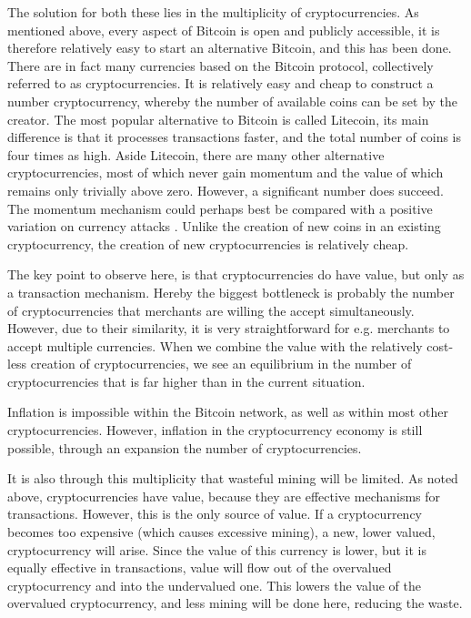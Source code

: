 \documentclass[12pt]{article}\usepackage[]{graphicx}\usepackage[]{color}
\begin{document}
The solution for both these lies in the multiplicity of cryptocurrencies.
As mentioned above, every aspect of Bitcoin is open and publicly accessible,
it is therefore relatively easy to start an alternative Bitcoin, and this has been done.
There are in fact many currencies based on the Bitcoin protocol, collectively referred to as
cryptocurrencies.
It is relatively easy and cheap to construct a number cryptocurrency, whereby the number of available coins can be set by the creator.
The most popular alternative to Bitcoin is called Litecoin,
its main difference is that it processes transactions faster, and the total number of coins is four times as high.
Aside Litecoin, there are many other alternative cryptocurrencies,
most of which never gain momentum and the value of which remains only trivially above zero.
However, a significant number does succeed.
The momentum mechanism could perhaps best be compared with a positive variation on currency attacks 
\parencite{obstfeld1986rational,obstfeld1995logic,obstfeld1996models}.
Unlike the creation of new coins in an existing cryptocurrency, the creation of new cryptocurrencies is relatively cheap.

The key point to observe here, is that cryptocurrencies do have value, but only as a transaction mechanism.
Hereby the biggest bottleneck is probably the number of cryptocurrencies that merchants are willing the accept simultaneously.
However, due to their similarity, it is very straightforward for e.g. merchants to accept multiple currencies.
When we combine the value with the relatively cost-less creation of cryptocurrencies,
we see an equilibrium in the number of cryptocurrencies that is far higher than in the current situation.

Inflation is impossible within the Bitcoin network, as well as within most other cryptocurrencies.
However, inflation in the cryptocurrency economy is still possible, through an expansion the number of cryptocurrencies.

It is also through this multiplicity that wasteful mining will be limited.
As noted above, cryptocurrencies have value, because they are effective mechanisms for transactions.
However, this is the only source of value.
If a cryptocurrency becomes too expensive (which causes excessive mining), 
a new, lower valued, cryptocurrency will arise.
Since the value of this currency is lower, but it is equally effective in transactions,
value will flow out of the overvalued cryptocurrency and into the undervalued one.
This lowers the value of the overvalued cryptocurrency, and less mining will be done here, reducing the waste.
\end{document}
